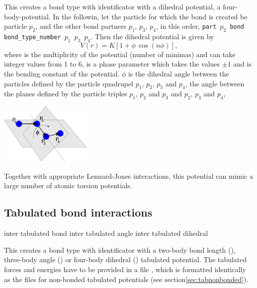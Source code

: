 This creates a bond type with identificator  with a
dihedral potential, \ie a four-body-potential. In the followin, let the particle
for which the bond is created be particle $p_2$, and the other bond partners
$p_1$, $p_3$, $p_4$, in this order, \ie \texttt{part $p_2$ bond bond_type_number
  $p_1$ $p_3$ $p_4$}. Then the dihedral potential is given by
\begin{equation}
  V(r) = K\left[1 + \phi\,\cos(n\phi)\right],
\end{equation}
where  is the multiplicity of the potential (number of minimas) and can
take integer values from 1 to 6,  is a phase parameter which takes the
values $\pm1$ and  is the bending constant of the potential. $\phi$ is
the dihedral angle between the particles defined by the particle quadrupel
$p_1$, $p_2$, $p_3$ and $p_4$, \ie the angle between the planes defined by the
particle triples $p_1$, $p_2$ and $p_3$ and $p_2$, $p_3$ and $p_4$, \ie
\begin{center}
  \includegraphics[height=8em]{figures/dihedral-angle.pdf}
\end{center}
Together with appropriate Lennard-Jones interactions, this potential can mimic a
large number of atomic torsion potentials.

\subsection{Tabulated bond interactions}

\begin{essyntax}
     inter 
    tabulated bond 
     inter 
    tabulated angle 
     inter 
    tabulated dihedral 
\end{essyntax}

This creates a bond type with identificator  with a
two-body bond length (), three-body angle () or four-body
dihedral () tabulated potential. The tabulated forces and energies
have to be provided in a file , which is formatted identically as
the files for non-bonded tabulated potentials (see
section\ref{sec:tabnonbonded}).

